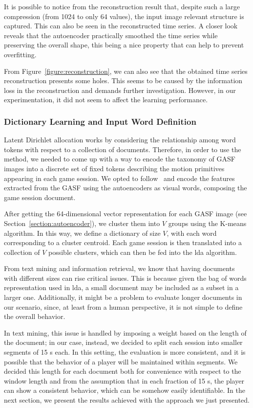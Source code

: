 It is possible to notice from the reconstruction result that, despite such a large compression (from 1024 to only 64 values), the input image relevant structure is captured. This can also be seen in the reconstructed time series. A closer look reveals that the autoencoder practically smoothed the time series while preserving the overall shape, this being a nice property that can help to prevent overfitting.

From Figure~\ref{figure:reconstruction}, we can also see that the obtained time series reconstruction presents some holes. This seems to be caused by the information loss in the reconstruction and demands further investigation. However, in our experimentation, it did not seem to affect the learning performance. 

\subsubsection{Dictionary Learning and Input Word Definition}
Latent Dirichlet allocation works by considering the relationship among word tokens with respect to a collection of documents. Therefore, in order to use the method, we needed to come up with a way to encode the taxonomy of GASF images into a discrete set of fixed tokens describing the motion primitives appearing in each game session. We opted to follow~\cite{prince_computer_2012} and encode the features extracted from the GASF using the autoencoders as visual words, composing the game session document.

After getting the 64-dimensional vector representation for each GASF image (see Section~\ref{section:autoencoder}), we cluster them into $V$ groups using the K-means algorithm. In this way, we define a dictionary of size $V$, with each word corresponding to a cluster centroid. Each game session is then translated into a collection of $V$ possible clusters, which can then be fed into the \gls{lda} algorithm.

From text mining and information retrieval, we know that having documents with different sizes can rise critical issues. This is because given the bag of words representation used in \gls{lda}, a small document may be included as a subset in a larger one. Additionally, it might be a problem to evaluate longer documents in our scenario, since, at least from a human perspective, it is not simple to define the overall behavior. %

In text mining, this issue is handled by imposing a weight based on the length of the document; in our case, instead, we decided to split each session into smaller segments of 15 s each. In this setting, the evaluation is more consistent, and it is possible that the behavior of a player will be maintained within segments. We decided this length for each document both for convenience with respect to the window length and from the assumption that in each fraction of 15 s, the player can show a consistent behavior, which can be somehow easily identifiable. In the next section, we present the results achieved with the approach we just presented.


